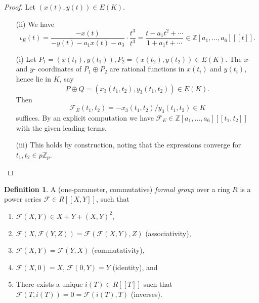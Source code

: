 \documentclass[a4paper]{article}
\theoremstyle{definition}
\newtheorem*{definition}{Definition}
\newcommand{\series}[2]{#1[\![#2]\!]}
\newcommand{\calF}{\mathcal{F}}
\newcommand{\Z}{\mathbb{Z}}
\begin{document}
\begin{proof}
    Let $(x(t),y(t))\in E(K)$.
    \begin{enumerate}
        \item[(ii)] We have
            \begin{equation*}
                \iota_E(t)
                    = \frac{-x(t)}{-y(t)-a_1x(t)-a_3}
                        \cdot\frac{t^3}{t^3}
                    = \frac{t-a_1t^2+\cdots}{1+a_1t+\cdots}
                    \in\series{\Z[a_1,\ldots,a_6]}{t}.
        \end{equation*}

        \item[(i)] Let $P_1=(x(t_1),y(t_1)),P_2=(x(t_2),y(t_2))\in E(K)$. The $x$-
            and $y$- coordinates of $P_1\oplus P_2$ are rational functions in
            $x(t_i)$ and $y(t_i)$, hence lie in $K$, say
            \begin{equation*}
                P\oplus Q = (x_3(t_1,t_2),y_3(t_1,t_2)) \in E(K).
            \end{equation*}
            Then
            \begin{equation*}
                \calF_E(t_1,t_2) = -x_3(t_1,t_2)/y_3(t_1,t_2) \in K
            \end{equation*}
            suffices. By an explicit computation we have
            $\calF_E\in\series{\Z[a_1,\ldots,a_6]}{t_1,t_2}$ with the given
            leading terms.

        \item[(iii)] This holds by construction, noting that the expressions
            converge for $t_1,t_2\in p\Z_p$.
    \end{enumerate}
\end{proof}

\begin{definition}
    A (one-parameter, commutative) \emph{formal group} over a ring $R$ is a
    power series $\calF\in\series{R}{X,Y}$, such that
    \begin{enumerate}[label=(\roman*)]
        \item $\calF(X,Y)\in X+Y+(X,Y)^2$,
        \item $\calF(X,\calF(Y,Z))=\calF(\calF(X,Y),Z)$ (associativity),
        \item $\calF(X,Y)=\calF(Y,X)$ (commutativity),
        \item $\calF(X,0)=X$, $\calF(0,Y)=Y$ (identity), and
        \item There exists a unique $i(T)\in\series{R}{T}$ such that
            $\calF(T,i(T))=0=\calF(i(T),T)$ (inverses).
    \end{enumerate}
\end{definition}
\end{document}
